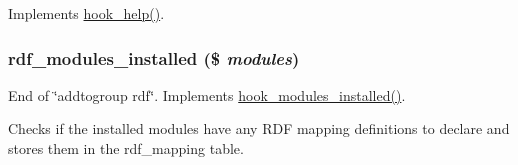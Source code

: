 Implements \hyperlink{group__hooks_ga5589c2714a782738e8851c4c90231f0e}{hook\_\-help()}. \hypertarget{rdf_8module_a595f2f383674a0158f65f56337e157d3}{
\subsubsection[{rdf\_\-modules\_\-installed}]{\setlength{\rightskip}{0pt plus 5cm}rdf\_\-modules\_\-installed (\$ {\em modules})}}
\label{rdf_8module_a595f2f383674a0158f65f56337e157d3}
End of \char`\"{}addtogroup rdf\char`\"{}. Implements \hyperlink{group__hooks_ga71b7268520567cac1a2f296c205e5227}{hook\_\-modules\_\-installed()}.

Checks if the installed modules have any RDF mapping definitions to declare and stores them in the rdf\_\-mapping table.

